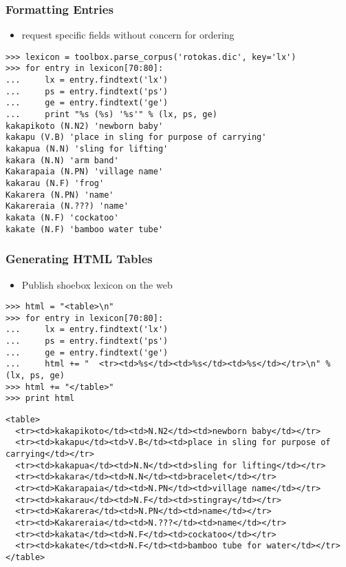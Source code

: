 \documentclass{beamer}             %
\begin{document}
\begin{frame}[fragile]
\frametitle{Formatting Entries}

\begin{itemize}
\item request specific fields without concern for ordering
\end{itemize}
\scriptsize

\begin{verbatim}
>>> lexicon = toolbox.parse_corpus('rotokas.dic', key='lx')
>>> for entry in lexicon[70:80]:
...     lx = entry.findtext('lx')
...     ps = entry.findtext('ps')
...     ge = entry.findtext('ge')
...     print "%s (%s) '%s'" % (lx, ps, ge)
kakapikoto (N.N2) 'newborn baby'
kakapu (V.B) 'place in sling for purpose of carrying'
kakapua (N.N) 'sling for lifting'
kakara (N.N) 'arm band'
Kakarapaia (N.PN) 'village name'
kakarau (N.F) 'frog'
Kakarera (N.PN) 'name'
Kakareraia (N.???) 'name'
kakata (N.F) 'cockatoo'
kakate (N.F) 'bamboo water tube'
\end{verbatim}
\end{frame}

\begin{frame}[fragile]
\frametitle{Generating HTML Tables}

\begin{itemize}
\item Publish shoebox lexicon on the web
\end{itemize}
\scriptsize

\begin{verbatim}
>>> html = "<table>\n"
>>> for entry in lexicon[70:80]:
...     lx = entry.findtext('lx')
...     ps = entry.findtext('ps')
...     ge = entry.findtext('ge')
...     html += "  <tr><td>%s</td><td>%s</td><td>%s</td></tr>\n" % (lx, ps, ge)
>>> html += "</table>"
>>> print html
\end{verbatim}

\tiny

\begin{verbatim}
<table>
  <tr><td>kakapikoto</td><td>N.N2</td><td>newborn baby</td></tr>
  <tr><td>kakapu</td><td>V.B</td><td>place in sling for purpose of carrying</td></tr>
  <tr><td>kakapua</td><td>N.N</td><td>sling for lifting</td></tr>
  <tr><td>kakara</td><td>N.N</td><td>bracelet</td></tr>
  <tr><td>Kakarapaia</td><td>N.PN</td><td>village name</td></tr>
  <tr><td>kakarau</td><td>N.F</td><td>stingray</td></tr>
  <tr><td>Kakarera</td><td>N.PN</td><td>name</td></tr>
  <tr><td>Kakareraia</td><td>N.???</td><td>name</td></tr>
  <tr><td>kakata</td><td>N.F</td><td>cockatoo</td></tr>
  <tr><td>kakate</td><td>N.F</td><td>bamboo tube for water</td></tr>
</table>
\end{verbatim}
\end{frame}
\end{document}
